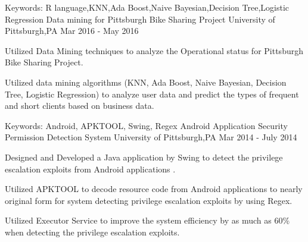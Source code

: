 \begin{cventries}
    \cventry
    {Keywords: R language,KNN,Ada Boost,Naive Bayesian,Decision Tree,Logistic Regression} %
    {Data mining for Pittsburgh Bike Sharing Project} %
    {University of Pittsburgh,PA} %
    {Mar 2016 - May 2016}  %
    {
      \begin{cvitems}
      	\item {Utilized Data Mining techniques to analyze the Operational status
for Pittsburgh Bike Sharing Project.}
		\item {Utilized data mining algorithms (KNN, Ada Boost, Naive Bayesian, Decision Tree, Logistic Regression) to analyze user data and predict the types of frequent and short clients based on business data.}
      \end{cvitems}
    }



  \cventry
    {Keywords: Android, APKTOOL, Swing, Regex} %
    {Android Application Security Permission Detection System} %
    {University of Pittsburgh,PA} %
    {Mar 2014 - July 2014}  %
    {
      \begin{cvitems}
        \item {Designed and Developed a Java application by Swing to detect the privilege escalation exploits from Android applications .}
         \item {Utilized APKTOOL to decode resource code from Android applications to nearly original form for system detecting privilege escalation exploits by using Regex.}
        \item {Utilized Executor Service to improve the system efficiency by as much as 60\% when detecting the privilege escalation exploits.}
      \end{cvitems}
    }


\end{cventries}
